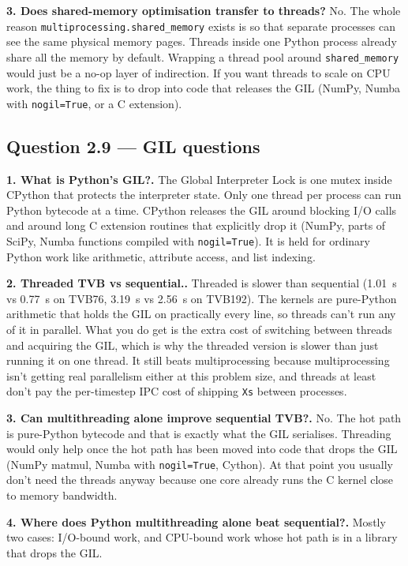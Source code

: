 \documentclass[11pt,a4paper]{article}
\newcommand{\Q}[1]{\subsection*{Question #1}}
\newcommand{\Qpart}[1]{\textbf{#1.}}
\begin{document}
\textbf{3. Does shared-memory optimisation transfer to threads?} No.
The whole reason \texttt{multiprocessing.shared\_memory} exists is so
that separate processes can see the same physical memory pages.
Threads inside one Python process already share all the memory by
default. Wrapping a thread pool around \texttt{shared\_memory} would
just be a no-op layer of indirection. If you want threads to scale
on CPU work, the thing to fix is to drop into code that releases the
GIL (NumPy, Numba with \texttt{nogil=True}, or a C extension).

\Q{2.9 — GIL questions}

\Qpart{1. What is Python's GIL?} The Global Interpreter Lock is one
mutex inside CPython that protects the interpreter state. Only one
thread per process can run Python bytecode at a time. CPython
releases the GIL around blocking I/O calls and around long C
extension routines that explicitly drop it (NumPy, parts of SciPy,
Numba functions compiled with \texttt{nogil=True}). It is held for
ordinary Python work like arithmetic, attribute access, and list
indexing.

\Qpart{2. Threaded TVB vs sequential.} Threaded is slower than
sequential (1.01~s vs 0.77~s on TVB76, 3.19~s vs 2.56~s on TVB192).
The kernels are pure-Python arithmetic that holds the GIL on
practically every line, so threads can't run any of it in parallel.
What you do get is the extra cost of switching between threads and
acquiring the GIL, which is why the threaded version is slower than
just running it on one thread. It still beats multiprocessing
because multiprocessing isn't getting real parallelism either at this
problem size, and threads at least don't pay the per-timestep IPC
cost of shipping \texttt{Xs} between processes.

\Qpart{3. Can multithreading alone improve sequential TVB?} No. The
hot path is pure-Python bytecode and that is exactly what the GIL
serialises. Threading would only help once the hot path has been
moved into code that drops the GIL (NumPy matmul, Numba with
\texttt{nogil=True}, Cython). At that point you usually don't need
the threads anyway because one core already runs the C kernel close
to memory bandwidth.

\Qpart{4. Where does Python multithreading alone beat sequential?}
Mostly two cases: I/O-bound work, and CPU-bound work whose hot path
is in a library that drops the GIL.
\end{document}
